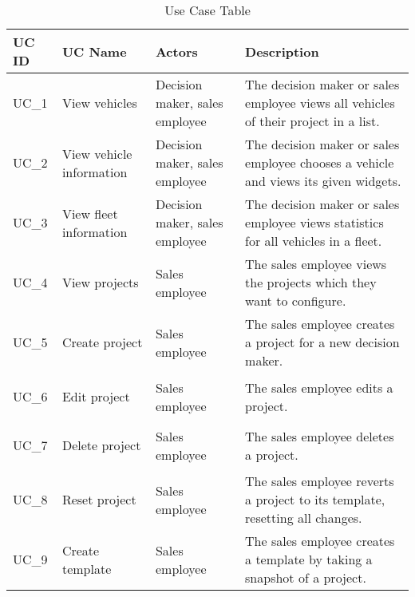 \sffamily
\begin{footnotesize}
  \renewcommand{\arraystretch}{1.4}
  \begin{longtable}[i i i L]{ p{} p{} p{} p{} }
    \caption                       %
        {Use Case Table} %
        \\
    \toprule
    \textbf{UC ID} & \textbf{UC Name} & \textbf{Actors}  & \textbf{Description}\\
    \midrule
    \hypertarget{Ref:UC1}{UC\_1} & View vehicles & Decision maker, sales employee & The decision maker or sales employee views all vehicles of their project in a list.\\
    
    \rowcolor{Gray}
    \hypertarget{Ref:UC2}{UC\_2} & View vehicle information & Decision maker, sales employee & The decision maker or sales employee chooses a vehicle and views its given \glspl{widget}.\\
    
    \hypertarget{Ref:UC3}{UC\_3}  & View fleet information & Decision maker, sales employee & The decision maker or sales employee views statistics for all vehicles in a fleet.\\
    
    \rowcolor{Gray}
    \hypertarget{Ref:UC4}{UC\_4}  & View projects & Sales employee & The sales employee views the projects which they want to configure.\\
    
    \hypertarget{Ref:UC5}{UC\_5} & Create project & Sales employee & The sales employee creates a project for a new decision maker.\\
    
    \rowcolor{Gray}
    \hypertarget{Ref:UC6}{UC\_6} & Edit project & Sales employee & The sales employee edits a project.\\
    
    \hypertarget{Ref:UC7}{UC\_7} & Delete project & Sales employee & The sales employee deletes a project.\\
    
    \rowcolor{Gray}
    \hypertarget{Ref:UC8}{UC\_8} & Reset project & Sales employee & The sales employee reverts a project to its template, resetting all changes.\\
    
    \hypertarget{Ref:UC9}{UC\_9} & Create template & Sales employee & The sales employee creates a template by taking a snapshot of a project.\\
    

\end{longtable}
\end{footnotesize}
